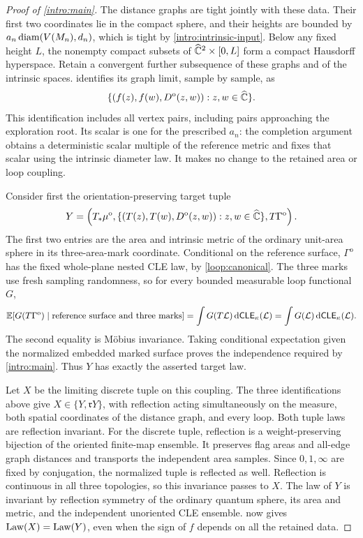 \begin{proof}[Proof of \cref{intro:main}]
The distance graphs are tight jointly with these data. Their first two
coordinates lie in the compact sphere, and their heights are bounded
by $a_n\operatorname{diam}(V(M_n),d_n)$, which is tight by
\cref{intro:intrinsic-input}. Below any fixed height $L$, the
nonempty compact subsets of $\widehat{\mathbb C}^2\times[0,L]$ form a compact
Hausdorff hyperspace. Retain a convergent further subsequence of these
graphs and of the intrinsic spaces.  identifies
its graph limit, sample by sample, as
\[
 \{(f(z),f(w),D^{\mathrm o}(z,w)):z,w\in\widehat{\mathbb C}\}.
\]
This identification includes all vertex pairs, including pairs
approaching the exploration root. Its scalar is one for the prescribed
$a_n$: the completion argument obtains a deterministic scalar multiple
of the reference metric and fixes that scalar using the intrinsic
diameter law. It makes no change to the retained area or loop coupling.

Consider first the orientation-preserving target tuple
\[
 Y=\left(T_*\mu^{\mathrm o},
   \{(T(z),T(w),D^{\mathrm o}(z,w)):z,w\in\widehat{\mathbb C}\},
   T\Gamma^{\mathrm o}\right).
\]
The first two entries are the area and intrinsic metric of the ordinary
unit-area sphere in its three-area-mark coordinate. Conditional on the
reference surface, $\Gamma^{\mathrm o}$ has the fixed whole-plane
nested CLE law, by \cref{loop:canonical}. The three marks use fresh
sampling randomness, so for every bounded measurable loop functional
$G$,
\[
 \mathbb E[G(T\Gamma^{\mathrm o})\mid
           \text{reference surface and three marks}]
 =\int G(T\mathcal L)\,\mathrm d\mathsf{CLE}_{\kappa}(\mathcal L)
 =\int G(\mathcal L)\,\mathrm d\mathsf{CLE}_{\kappa}(\mathcal L).
\]
The second equality is M\"obius invariance. Taking conditional
expectation given the normalized embedded marked surface proves the
independence required by \cref{intro:main}. Thus $Y$ has exactly the
asserted target law.

Let $X$ be the limiting discrete tuple on this coupling. The three
identifications above give $X\in\{Y,\mathfrak r Y\}$, with reflection
acting simultaneously on the measure, both spatial coordinates of the
distance graph, and every loop. Both tuple laws are reflection invariant.
For the discrete tuple, reflection is a weight-preserving bijection of
the oriented finite-map ensemble. It preserves flag areas and all-edge
graph distances and transports the independent area samples. Since
$0,1,\infty$ are fixed by conjugation, the normalized tuple is reflected
as well. Reflection is continuous in all three topologies, so this
invariance passes to $X$. The law of $Y$ is invariant by reflection
symmetry of the ordinary quantum sphere, its area and metric, and the
independent unoriented CLE ensemble.  now gives
$\operatorname{Law}(X)=\operatorname{Law}(Y)$, even when the sign of $f$ depends on all the retained
data.


\end{proof}
